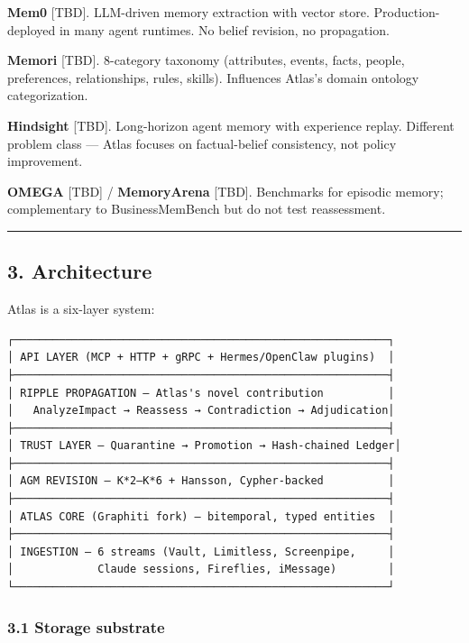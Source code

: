 \documentclass[
  11pt,
]{article}
\begin{document}
\textbf{Mem0} {[}TBD{]}. LLM-driven memory extraction with vector store.
Production-deployed in many agent runtimes. No belief revision, no
propagation.

\textbf{Memori} {[}TBD{]}. 8-category taxonomy (attributes, events,
facts, people, preferences, relationships, rules, skills). Influences
Atlas's domain ontology categorization.

\textbf{Hindsight} {[}TBD{]}. Long-horizon agent memory with experience
replay. Different problem class --- Atlas focuses on factual-belief
consistency, not policy improvement.

\textbf{OMEGA} {[}TBD{]} / \textbf{MemoryArena} {[}TBD{]}. Benchmarks
for episodic memory; complementary to BusinessMemBench but do not test
reassessment.

\begin{center}\rule{0.5\linewidth}{0.5pt}\end{center}

\subsection{3. Architecture}\label{architecture}

Atlas is a six-layer system:

\begin{verbatim}
┌──────────────────────────────────────────────────────────┐
│ API LAYER (MCP + HTTP + gRPC + Hermes/OpenClaw plugins)  │
├──────────────────────────────────────────────────────────┤
│ RIPPLE PROPAGATION — Atlas's novel contribution          │
│   AnalyzeImpact → Reassess → Contradiction → Adjudication│
├──────────────────────────────────────────────────────────┤
│ TRUST LAYER — Quarantine → Promotion → Hash-chained Ledger│
├──────────────────────────────────────────────────────────┤
│ AGM REVISION — K*2–K*6 + Hansson, Cypher-backed          │
├──────────────────────────────────────────────────────────┤
│ ATLAS CORE (Graphiti fork) — bitemporal, typed entities  │
├──────────────────────────────────────────────────────────┤
│ INGESTION — 6 streams (Vault, Limitless, Screenpipe,     │
│             Claude sessions, Fireflies, iMessage)        │
└──────────────────────────────────────────────────────────┘
\end{verbatim}

\subsubsection{3.1 Storage substrate}\label{storage-substrate}
\end{document}
